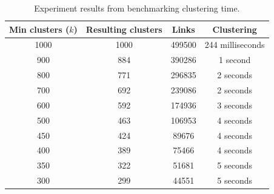 \begin{table}[H]
    \begin{tabular}{|c|c|c|c|}\hline
        Min clusters ($k$) & Resulting clusters & Links  & Clustering       \\\hline%
        1000               & 1000               & 499500 & 244 milliseconds \\\hline%
        900                & 884                & 390286 & 1 second         \\\hline%
        800                & 771                & 296835 & 2 seconds        \\\hline%
        700                & 692                & 239086 & 2 seconds        \\\hline%
        600                & 592                & 174936 & 3 seconds        \\\hline%
        500                & 463                & 106953 & 4 seconds        \\\hline%
        450                & 424                & 89676  & 4 seconds        \\\hline%
        400                & 389                & 75466  & 4 seconds        \\\hline%
        350                & 322                & 51681  & 5 seconds        \\\hline%
        300                & 299                & 44551  & 5 seconds        \\\hline%
    \end{tabular}
    \caption{Experiment results from benchmarking clustering time.}
    \label{table:clustering-benchmark}
\end{table}

